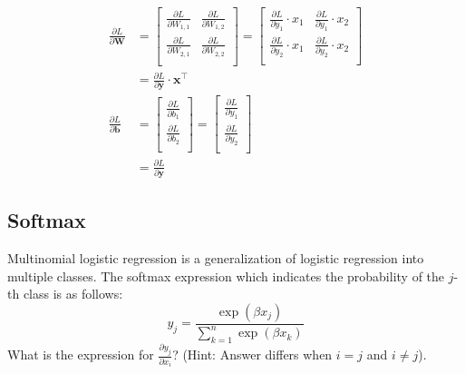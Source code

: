 \documentclass{article}
\begin{document}
\begin{align*}
    \frac{\partial L}{\partial \bm{W}} &= \begin{bmatrix}
                    \frac{\partial L}{\partial W_{1,1}} & \frac{\partial L}{\partial W_{1,2}} \\
                    \frac{\partial L}{\partial W_{2,1}} & \frac{\partial L}{\partial W_{2,2}} \\
                \end{bmatrix} = \begin{bmatrix}
                    \frac{\partial L}{\partial y_{1}} \cdot x_1 & \frac{\partial L}{\partial y_{1}} \cdot x_2 \\
                    \frac{\partial L}{\partial y_{2}} \cdot x_1 & \frac{\partial L}{\partial y_{2}} \cdot x_2 \\
                \end{bmatrix} \\
    &= \frac{\partial L}{\partial \bm{y}} \cdot \bm{x}^\top \\
    \frac{\partial L}{\partial \bm{b}} &= \begin{bmatrix}
                    \frac{\partial L}{\partial b_{1}} \\
                    \frac{\partial L}{\partial b_{2}} \\
                \end{bmatrix} = \begin{bmatrix}
                    \frac{\partial L}{\partial y_{1}} \\
                    \frac{\partial L}{\partial y_{2}} \\
                \end{bmatrix} \\
    &= \frac{\partial L}{\partial \bm{y}}
\end{align*}

\subsection{Softmax}
Multinomial logistic regression is a generalization of logistic regression into multiple classes. The softmax expression which indicates
the probability of the $j$-th class is as follows:
    \begin{equation*}
        y_j = \frac{\exp(\beta x_j)}{\sum_{k=1}^n \exp(\beta x_k)}
    \end{equation*}
What is the expression for $\frac{\partial y_j}{\partial x_i}$? (Hint: Answer differs when $i = j$ and $i \neq j$).
\end{document}
